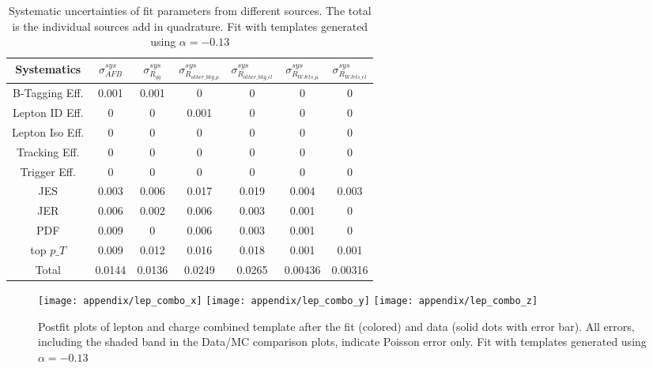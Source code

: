 \begin{table}[htb]
\centering
\begin{tabular}{c|cc|cccc}
Systematics &    $\sigma_{AFB}^{sys}$ & $\sigma_{R_{q\bar{q}}}^{sys}$ & $\sigma_{R_{other\_bkg\_\mu}}^{sys}$ & $\sigma_{R_{other\_bkg\_el}}^{sys}$ & $\sigma_{R_{WJets\_\mu}}^{sys}$ & $\sigma_{R_{WJets\_el}}^{sys}$  \\
\hline
B-Tagging Eff.  &   0.001 &    0.001 &                  0 &                  0 &              0 &              0 \\
Lepton ID Eff.  &       0 &        0 &              0.001 &                  0 &              0 &              0 \\
Lepton Iso Eff. &       0 &        0 &                  0 &                  0 &              0 &              0 \\
Tracking Eff.   &       0 &        0 &                  0 &                  0 &              0 &              0 \\
Trigger Eff.    &       0 &        0 &                  0 &                  0 &              0 &              0 \\
JES             &   0.003 &    0.006 &              0.017 &              0.019 &          0.004 &          0.003 \\
JER             &   0.006 &    0.002 &              0.006 &              0.003 &          0.001 &              0 \\
PDF             &   0.009 &        0 &              0.006 &              0.003 &          0.001 &              0 \\
top $p\_T$         &   0.009 &    0.012 &              0.016 &              0.018 &          0.001 &          0.001 \\
\hline
Total           &  0.0144 &   0.0136 &             0.0249 &             0.0265 &        0.00436 &        0.00316 \\
\hline
\end{tabular}
\caption{Systematic uncertainties of fit parameters from different sources. The total is the individual sources add in quadrature. Fit with templates generated using $\alpha=-0.13$ }
\label{tab:sys-err-old-alpha}
\end{table}


\begin{figure}[hbt]
  \begin{center}
    \texttt{[image: appendix/lep\_combo\_x]}
    \texttt{[image: appendix/lep\_combo\_y]}
    \texttt{[image: appendix/lep\_combo\_z]}
  \caption{\small Postfit plots of lepton and charge combined template after the fit (colored) and data (solid dots with error bar). All errors, including the shaded band in the Data/MC comparison plots, indicate Poisson error only. Fit with templates generated using $\alpha=-0.13$}
    \label{fig:postfit combined old alpha}
  \end{center}
\end{figure}

